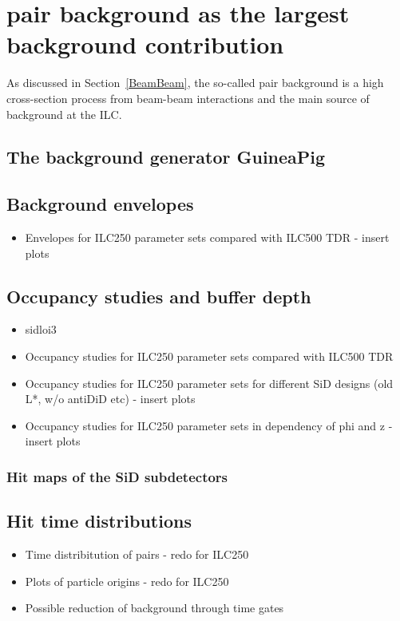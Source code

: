 \chapter{\positron\electron pair background as the largest background contribution}
\label{PairBkg}
As discussed in Section~\ref{BeamBeam}, the so-called pair background is a high cross-section process from beam-beam interactions and the main source of background at the ILC.


\section{The background generator GuineaPig}
\label{PairBkg:GuineaPig}

\section{Background envelopes}
\label{PairBkg:helix}
\begin{itemize}
 \item Envelopes for ILC250 parameter sets compared with ILC500 TDR - insert plots
\end{itemize}

\section{Occupancy studies and buffer depth}
\label{PairBkg:occupancy}

\begin{itemize}
 \item sidloi3
 \item Occupancy studies for ILC250 parameter sets compared with ILC500 TDR
 \item Occupancy studies for ILC250 parameter sets for different SiD designs (old L*, w/o antiDiD etc) - insert plots
 \item Occupancy studies for ILC250 parameter sets in dependency of phi and z - insert plots
\end{itemize}

\subsection{Hit maps of the SiD subdetectors}
\label{PairBkg:hitmaps}


\section{Hit time distributions}
\label{PairBkg:hittime}

\begin{itemize}
 \item Time distribitution of pairs - redo for ILC250
 \item Plots of particle origins - redo for ILC250
 \item Possible reduction of background through time gates
\end{itemize}

